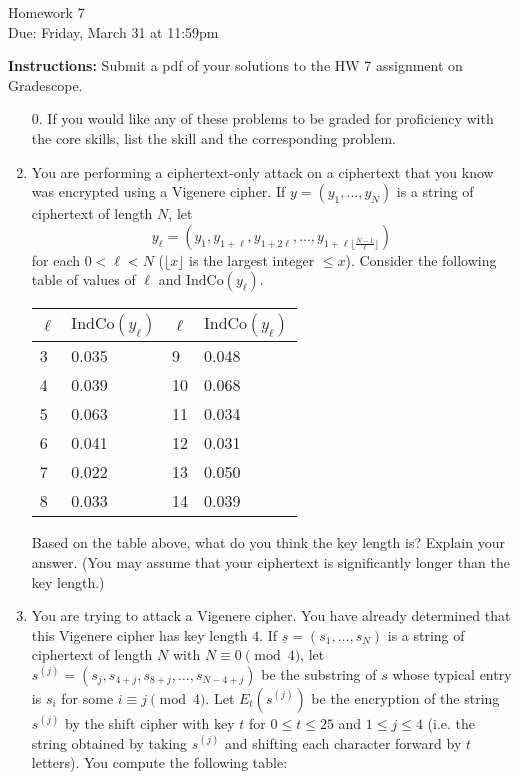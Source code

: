 \documentclass[12pt]{article}
\begin{document}
\begin{center}
{\Large Homework 7}\\
Due: Friday,  March 31 at 11:59pm\\


\end{center}
{\bf Instructions:} Submit a pdf of your solutions to the HW 7 assignment on Gradescope.  



\begin{enumerate}
\item[0.] If you would like any of these problems to be graded for proficiency with the core skills, list the skill and the corresponding problem. 


\item  You are performing a ciphertext-only attack on a ciphertext that you know was encrypted using a Vigenere cipher.  If $y = (y_1, \ldots, y_{N})$ is a string of ciphertext of length $N$, let $$y_{\ell} = (y_1, y_{1+\ell}, y_{1+2\ell}, \ldots, y_{1+\ell\lfloor{\frac{N-1}{\ell}}\rfloor})$$ for each $0 < \ell <N$ ($\lfloor x \rfloor$ is the largest integer $\le x$).  Consider the following table of values of $\ell$ and $\mathrm{IndCo}(y_{\ell})$.

\begin{center}
    \begin{tabular}{ l | l | l | l }
    $\ell$ & $\mathrm{IndCo}(y_\ell)$ &  $\ell$ & $\mathrm{IndCo}(y_\ell)$  \\ 
    \hline
    3 & 0.035 & 9  & 0.048\\ 
    4 & 0.039 & 10 & 0.068  \\ 
    5 & 0.063 & 11 & 0.034  \\
    6 & 0.041  & 12 & 0.031  \\
    7 & 0.022  &  13 & 0.050\\
    8 & 0.033  &  14 & 0.039\\
    \end{tabular}
\end{center}

Based on the table above, what do you think the key length is?  Explain your answer. (You may assume that your ciphertext is significantly longer than the key length.)

\item   You are trying to attack a Vigenere cipher.  You have already determined that this Vigenere cipher has key length $4$.  If $\underline{s} = (s_1, \ldots, s_{N})$ is a string of ciphertext of length $N$ with $N \equiv 0 \pmod4$, let $s^{(j)} = (s_j,s_{4+j},s_{8+j},\ldots,s_{N-4+j})$ be the substring of $s$ whose typical entry is $s_i$ for some $i \equiv j \pmod 4$.  Let $E_t(s^{(j)})$ be the encryption of the string $s^{(j)}$ by the shift cipher with key $t$ for $0 \leq t \leq 25$ and $1 \leq j \leq 4$ (i.e. the string obtained by taking $s^{(j)}$ and shifting each character forward by $t$ letters).  You compute the following table:


\end{enumerate}
\end{document}
